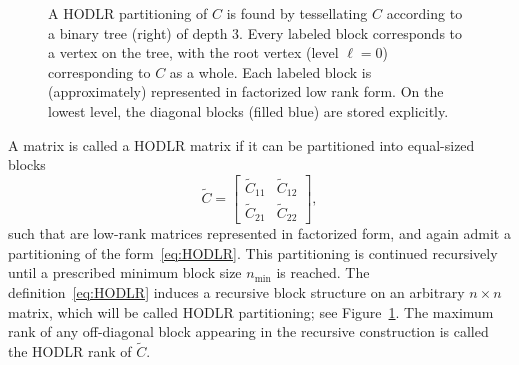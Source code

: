 \documentclass[final,reqno,onefignum,onetabnum]{siamart190516}
\newcommand{\nmin}{n_{\min}}
\begin{document}
\begin{figure}
\begin{tikzpicture}[sibling distance=5.5pt,scale=0.9, every node/.style={scale=0.9}]
\end{tikzpicture}
\caption{A HODLR partitioning of $C$ is found by tessellating $C$ according to a binary tree  (right) of depth $3$.   Every labeled block corresponds to a vertex on the tree, with the root vertex (level $\ell = 0$) corresponding to $C$ as a whole. Each labeled block is (approximately) represented in factorized low rank form. On the lowest level, the diagonal blocks (filled blue) are stored explicitly.}
\label{fig:HODLRandTree}
\end{figure}

A matrix  is called a HODLR matrix if it can be partitioned into equal-sized blocks
\begin{equation} 
\label{eq:HODLR}
\widetilde{C} = \begin{bmatrix} \widetilde{C}_{11} & \widetilde{C}_{12} \\ \widetilde{C}_{21} & \widetilde{C}_{22} \end{bmatrix}, 
\end{equation} 
such that  are low-rank matrices represented in factorized form, and  again admit a partitioning of the form~\eqref{eq:HODLR}. This partitioning is continued recursively until a prescribed minimum block size $\nmin$ is reached.
The definition~\eqref{eq:HODLR} induces a recursive block structure on an arbitrary $n\times n$ matrix, which will be called HODLR partitioning; see Figure~\ref{fig:HODLRandTree}. The maximum rank of any off-diagonal block appearing in the recursive construction is called the HODLR rank of $\widetilde{C}$.
\end{document}
